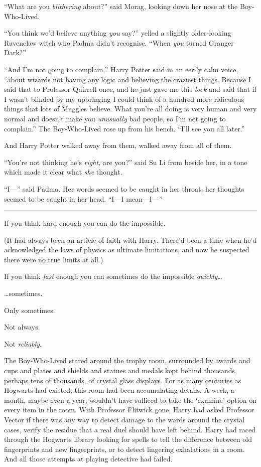 ``What are you \emph{blithering} about?'' said Morag, looking down her
nose at the Boy-Who-Lived.

``You think we'd believe anything \emph{you} say?'' yelled a slightly
older-looking Ravenclaw witch who Padma didn't recognise. ``When
\emph{you} turned Granger Dark?''

``And I'm not going to complain,'' Harry Potter said in an eerily calm
voice, ``about wizards not having any logic and believing the craziest
things. Because I said that to Professor Quirrell once, and he just gave
me this \emph{look} and said that if I wasn't blinded by my upbringing I
could think of a hundred more ridiculous things that lots of Muggles
believe. What you're all doing is very human and very normal and doesn't
make you \emph{unusually} bad people, so I'm not going to complain.''
The Boy-Who-Lived rose up from his bench. ``I'll see you all later.''

And Harry Potter walked away from them, walked away from all of them.

``You're not thinking he's \emph{right,} are you?'' said Su Li from
beside her, in a tone which made it clear what \emph{she} thought.

``I---'' said Padma. Her words seemed to be caught in her throat, her
thoughts seemed to be caught in her head. ``I---I mean---I---''

\begin{center}\rule{3in}{0.4pt}\end{center}

If you think hard enough you can do the impossible.

(It had always been an article of faith with Harry. There'd been a time
when he'd acknowledged the laws of physics as ultimate limitations, and
now he suspected there were no true limits at all.)

If you think \emph{fast} enough you can sometimes do the impossible
\emph{quickly}\ldots{}

\ldots{}sometimes.

Only sometimes.

Not always.

Not \emph{reliably}.

The Boy-Who-Lived stared around the trophy room, surrounded by awards
and cups and plates and shields and statues and medals kept behind
thousands, perhaps tens of thousands, of crystal glass displays. For as
many centuries as Hogwarts had existed, this room had been accumulating
details. A week, a month, maybe even a year, wouldn't have sufficed to
take the `examine' option on every item in the room. With Professor
Flitwick gone, Harry had asked Professor Vector if there was any way to
detect damage to the wards around the crystal cases, verify the residue
that a real duel should have left behind. Harry had raced through the
Hogwarts library looking for spells to tell the difference between old
fingerprints and new fingerprints, or to detect lingering exhalations in
a room. And all those attempts at playing detective had failed.

